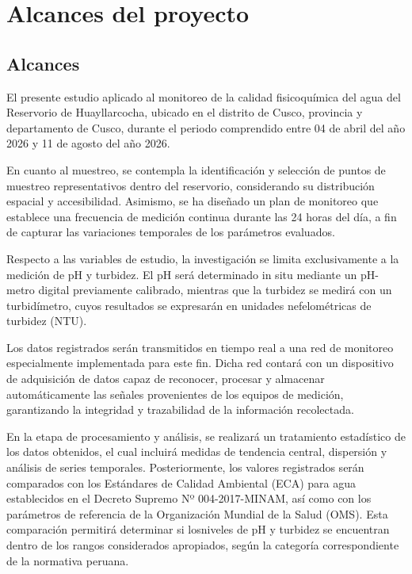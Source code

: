 \chapter{Alcances del proyecto}

\section{Alcances}
El presente estudio aplicado al monitoreo de la calidad fisicoquímica del agua del Reservorio de Huayllarcocha, ubicado en el distrito de Cusco, provincia y departamento de Cusco, durante el periodo comprendido entre 04 de abril del año 2026 y 11 de agosto del año 2026.

En cuanto al muestreo, se contempla la identificación y selección de puntos de muestreo representativos dentro del reservorio, considerando su distribución espacial y accesibilidad. Asimismo, se ha diseñado un plan de monitoreo que establece una frecuencia de medición continua durante las 24 horas del día, a fin de capturar las variaciones temporales de los parámetros evaluados.

Respecto a las variables de estudio, la investigación se limita exclusivamente a la medición de pH y turbidez. El pH será determinado in situ mediante un pH-metro digital previamente calibrado, mientras que la turbidez se medirá con un turbidímetro, cuyos resultados se expresarán en unidades nefelométricas de turbidez (NTU).

Los datos registrados serán transmitidos en tiempo real a una red de monitoreo especialmente implementada para este fin. Dicha red contará con un dispositivo de adquisición de datos capaz de reconocer, procesar y almacenar automáticamente las señales provenientes de los equipos de medición, garantizando la integridad y trazabilidad de la información recolectada.

En la etapa de procesamiento y análisis, se realizará un tratamiento estadístico de los datos obtenidos, el cual incluirá medidas de tendencia central, dispersión y análisis de series temporales. Posteriormente, los valores registrados serán comparados con los Estándares de Calidad Ambiental (ECA) para agua establecidos en el Decreto Supremo Nº 004-2017-MINAM, así como con los parámetros de referencia de la Organización Mundial de la Salud (OMS). Esta comparación permitirá determinar si losniveles de pH y turbidez se encuentran dentro de los rangos considerados apropiados, según la categoría correspondiente de la normativa peruana.

